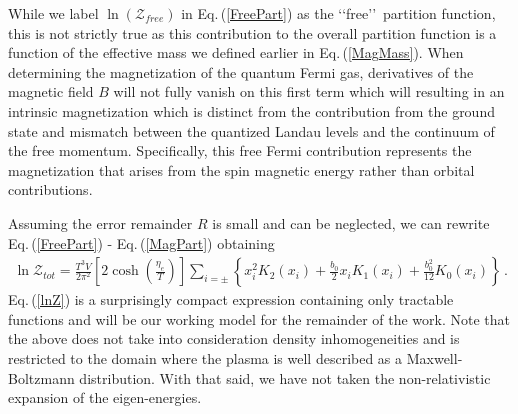 \documentclass[universe,article,submit,moreauthors,pdftex,a4paper]{Definitions/mdpi}
\newcommand{\req}[1]{Eq.\,(\ref{#1})}
\begin{document}
While we label $\ln(\mathcal{Z}_{free})$ in \req{FreePart} as the \lq\lq free\rq\rq\ partition function, this is not strictly true as this contribution to the overall partition function is a function of the effective mass we defined earlier in \req{MagMass}. When determining the magnetization of the quantum Fermi gas, derivatives of the magnetic field $B$ will not fully vanish on this first term which will resulting in an intrinsic magnetization which is distinct from the contribution from the ground state and mismatch between the quantized Landau levels and the continuum of the free momentum. Specifically, this free Fermi contribution represents the magnetization that arises from the spin magnetic energy rather than orbital contributions.

Assuming the error remainder $R$ is small and can be neglected, we can rewrite \req{FreePart} - \req{MagPart} obtaining
\begin{align}
 \label{lnZ}
 \ln\mathcal{Z}_{tot}=\frac{T^3V}{2\pi^2}\left[2\cosh\left(\frac{\eta_{e}}{T}\right)\right]\sum_{i=\pm}\left\{x_i^{2} K_2\left(x_i\right)+\frac{b_0}{2}x_iK_1\left(x_i\right)+\frac{b^2_0}{12}K_0\left(x_i\right)\right\}\,.
\end{align}
\req{lnZ} is a surprisingly compact expression containing only tractable functions and will be our working model for the remainder of the work. Note that the above does not take into consideration density inhomogeneities and is restricted to the domain where the plasma is well described as a Maxwell-Boltzmann distribution. With that said, we have not taken the non-relativistic expansion of the eigen-energies.

\end{document}
